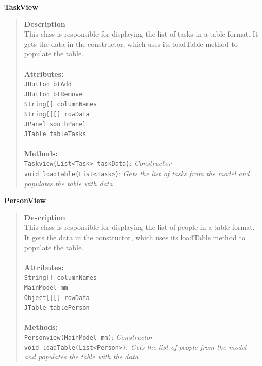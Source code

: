 \documentclass[12pt]{article}
\begin{document}
{\bf TaskView}
\begin{quote}
{\bf Description}\\
This class is responsible for displaying the list of tasks in a table format. It gets the data in the constructor, which uses its loadTable method to populate the table.\\\\
{\bf Attributes:}\\
\texttt{JButton btAdd}\\
\texttt{JButton btRemove}\\
\texttt{String[] columnNames}\\
\texttt{String[][] rowData}\\
\texttt{JPanel southPanel}\\
\texttt{JTable tableTasks}\\\\
{\bf Methods:}\\
\texttt{Taskview(List<Task> taskData)}:  \emph{Constructor}\\
\texttt{void loadTable(List<Task>)}: \emph{ Gets the list of tasks from the model and populates the table with data}
\end{quote}

{\bf PersonView}
\begin{quote}
{\bf Description}\\
This class is responsible for displaying the list of people in a table format. It gets the data in the constructor, which uses its loadTable method to populate the table.\\\\
{\bf Attributes:}\\
\texttt{String[] columnNames}\\
\texttt{MainModel mm}\\
\texttt{Object[][] rowData}\\
\texttt{JTable tablePerson}\\\\
{\bf Methods:}\\
\texttt{Personview(MainModel mm)}:  \emph{Constructor}\\
\texttt{void loadTable(List<Person>)}:  \emph{Gets the list of people from the model and populates the table with the data}
\end{quote}
\end{document}
